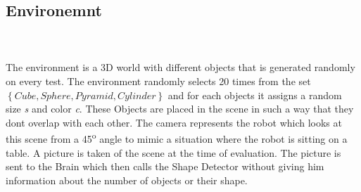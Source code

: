 \documentclass{article}
\begin{document}
     \subsection{Environemnt}
     \\\\
      The environment is a 3D world with different objects that is generated randomly on every test. The environment randomly selects 20 times from the set $\left\{ Cube, Sphere, Pyramid, Cylinder \right\}$ and for each objects it assigns a random size \textit{s} and color \textit{c}. These Objects are placed in the scene in such a way that they dont overlap with each other. The camera represents the robot which looks at this scene from a 45\textsuperscript{o} angle to mimic a situation where the robot is sitting on a table. A picture is taken of the scene at the time of evaluation. The picture is sent to the Brain which then calls the Shape Detector without giving him information about the number of objects or their shape.
\end{document}
